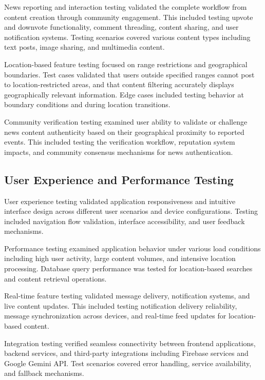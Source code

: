 News reporting and interaction testing validated the complete workflow from content creation through community engagement. This included testing upvote and downvote functionality, comment threading, content sharing, and user notification systems. Testing scenarios covered various content types including text posts, image sharing, and multimedia content.

Location-based feature testing focused on range restrictions and geographical boundaries. Test cases validated that users outside specified ranges cannot post to location-restricted areas, and that content filtering accurately displays geographically relevant information. Edge cases included testing behavior at boundary conditions and during location transitions.

Community verification testing examined user ability to validate or challenge news content authenticity based on their geographical proximity to reported events. This included testing the verification workflow, reputation system impacts, and community consensus mechanisms for news authentication.

\subsection{User Experience and Performance Testing}
\label{subsec:performance-testing}

User experience testing validated application responsiveness and intuitive interface design across different user scenarios and device configurations. Testing included navigation flow validation, interface accessibility, and user feedback mechanisms.

Performance testing examined application behavior under various load conditions including high user activity, large content volumes, and intensive location processing. Database query performance was tested for location-based searches and content retrieval operations.

Real-time feature testing validated message delivery, notification systems, and live content updates. This included testing notification delivery reliability, message synchronization across devices, and real-time feed updates for location-based content.

Integration testing verified seamless connectivity between frontend applications, backend services, and third-party integrations including Firebase services and Google Gemini API. Test scenarios covered error handling, service availability, and fallback mechanisms.


